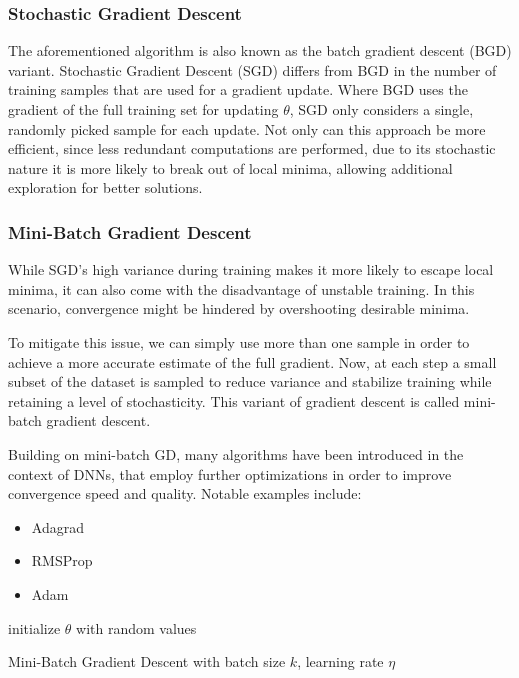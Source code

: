 \subsubsection{Stochastic Gradient Descent}
The aforementioned algorithm is also known as the batch gradient descent (BGD) variant. Stochastic Gradient Descent (SGD) differs from BGD in the number of training samples that are used for a gradient update. Where BGD uses the gradient of the full training set for updating $\theta$, SGD only considers a single, randomly picked sample for each update. Not only can this approach be more efficient, since less redundant computations are performed, due to its stochastic nature it is more likely to break out of local minima, allowing additional exploration for better solutions. \cite{ruder2016overview}

\subsubsection{Mini-Batch Gradient Descent}
While SGD's high variance during training makes it more likely to escape local minima, it can also come with the disadvantage of unstable training. In this scenario, convergence might be hindered by overshooting desirable minima.

To mitigate this issue, we can simply use more than one sample in order to achieve a more accurate estimate of the full gradient. Now, at each step a small subset of the dataset is sampled to reduce variance and stabilize training while retaining a level of stochasticity. This variant of gradient descent is called mini-batch gradient descent.

Building on mini-batch GD, many algorithms have been introduced in the context of DNNs, that employ further optimizations in order to improve convergence speed and quality. Notable examples include:
\begin{itemize}
    \item Adagrad \cite{duchi2011adaptive}
    \item RMSProp \cite{hinton2012neural}
    \item Adam \cite{kingma2014adam}
\end{itemize}

\begin{algorithm}
    \SetAlgoLined
    initialize $\theta$ with random values \;
    \caption{Mini-Batch Gradient Descent with batch size $k$, learning rate $\eta$}
\end{algorithm}

